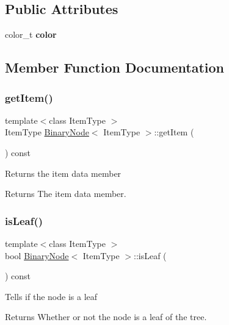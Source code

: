 \subsection*{Public Attributes}
\begin{DoxyCompactItemize}
\item 
\hypertarget{class_binary_node_a11390eb78e60c4a61b0c54dcf743063a}{}\label{class_binary_node_a11390eb78e60c4a61b0c54dcf743063a} 
color\+\_\+t {\bfseries color}
\end{DoxyCompactItemize}


\subsection{Member Function Documentation}
\hypertarget{class_binary_node_a10780d779ff7a9c51473715967a7a439}{}\label{class_binary_node_a10780d779ff7a9c51473715967a7a439} 
\subsubsection{\texorpdfstring{get\+Item()}{getItem()}}
{\footnotesize\ttfamily template$<$class Item\+Type $>$ \\
Item\+Type \hyperlink{class_binary_node}{Binary\+Node}$<$ Item\+Type $>$\+::get\+Item (\begin{DoxyParamCaption}{ }\end{DoxyParamCaption}) const}

Returns the item data member \begin{DoxyReturn}{Returns}
The item data member. 
\end{DoxyReturn}
\hypertarget{class_binary_node_a837d4805b46040906b8c5a331e73abee}{}\label{class_binary_node_a837d4805b46040906b8c5a331e73abee} 
\subsubsection{\texorpdfstring{is\+Leaf()}{isLeaf()}}
{\footnotesize\ttfamily template$<$class Item\+Type $>$ \\
bool \hyperlink{class_binary_node}{Binary\+Node}$<$ Item\+Type $>$\+::is\+Leaf (\begin{DoxyParamCaption}{ }\end{DoxyParamCaption}) const}

Tells if the node is a leaf \begin{DoxyReturn}{Returns}
Whether or not the node is a leaf of the tree. 
\end{DoxyReturn}
\hypertarget{class_binary_node_ab731c8cf87040e19ecba80f407b4d9b1}{}\label{class_binary_node_ab731c8cf87040e19ecba80f407b4d9b1} 

